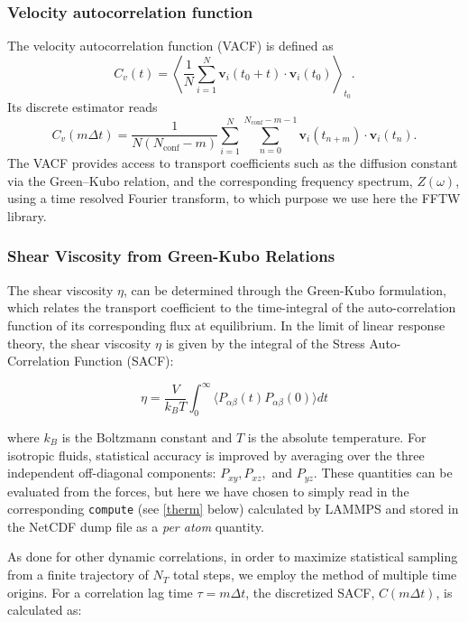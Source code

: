 \documentclass[final,1p,times]{elsarticle}
\begin{document}
\subsubsection{Velocity autocorrelation function}
The velocity autocorrelation function (VACF) is defined as
\[
C_v(t)= \left\langle \frac{1}{N} \sum_{i=1}^{N}
  \mathbf{v}_i(t_0+t)\cdot\mathbf{v}_i(t_0) \right\rangle_{t_0}. 
\]
Its discrete estimator reads
\[
C_v(m\Delta t)= \frac{1}{N(N_{\mathrm{conf}}-m)} \sum_{i=1}^{N}
\sum_{n=0}^{N_{\mathrm{conf}}-m-1} \mathbf{v}_i(t_{n+m})\cdot
\mathbf{v}_i(t_n). 
\]
The VACF provides access to transport coefficients such as the
diffusion constant via the Green--Kubo relation, and the corresponding
frequency spectrum, $Z(\omega)$, using a time resolved Fourier
transform, to which purpose we use here
the FFTW library\cite{Frigo2008FFTW3}. 

\subsubsection{Shear Viscosity from Green-Kubo Relations}

The shear viscosity
$\eta$, can be determined through the Green-Kubo formulation, which
relates the transport coefficient to the time-integral of the
auto-correlation function of its corresponding flux at equilibrium. 
In the limit of linear response theory, the shear viscosity $\eta$ is
given by the integral of the Stress Auto-Correlation Function (SACF): 

\begin{equation}
\eta = \frac{V}{k_B T} \int_0^\infty \langle P_{\alpha \beta}(t) P_{\alpha \beta}(0) \rangle dt
\end{equation}

where $k_B$ is the Boltzmann constant and $T$ is the absolute
temperature. For isotropic fluids, statistical accuracy is improved by
averaging over the three independent off-diagonal components: $P_{xy},
P_{xz},$ and $P_{yz}$. These quantities can be evaluated from the
forces, but here we have chosen to simply read in the corresponding
{\tt compute} (see \ref{therm} below) calculated by LAMMPS and stored
in the NetCDF dump file as a 
{\em per atom} quantity. 



As done for other dynamic correlations, in order  to maximize
statistical sampling from a finite trajectory of $N_T$ total steps, we
employ the method of multiple time origins. For a correlation lag time
$\tau = m \Delta t$, the discretized SACF, $C(m \Delta t)$, is
calculated as: 
\end{document}
